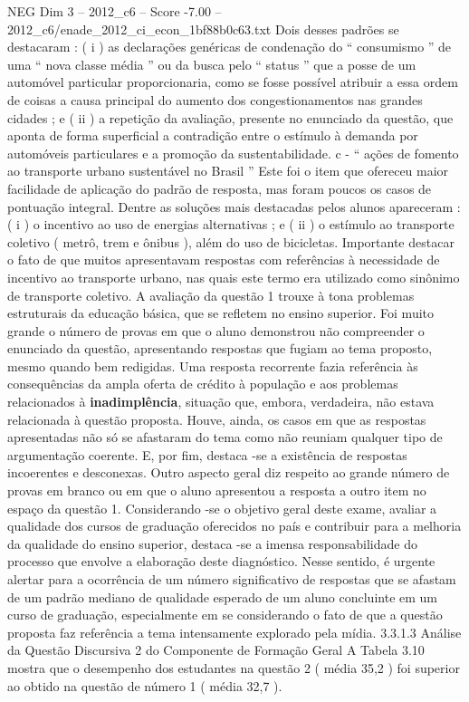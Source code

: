 \begin{textsample}{NEG Dim 3 – 2012\_c6 – Score -7.00 – 2012\_c6/enade\_2012\_ci\_econ\_1bf88b0c63.txt}
Dois desses padrões se destacaram : ( i ) as declarações genéricas de condenação do “ consumismo ” de uma “ nova classe média ” ou da busca pelo “ status ” que a posse de um automóvel particular proporcionaria, como se fosse possível atribuir a essa ordem de coisas a causa principal do aumento dos congestionamentos nas grandes cidades ; e ( ii ) a repetição da avaliação, presente no enunciado da questão, que aponta de forma superficial a contradição entre o estímulo à demanda por automóveis particulares e a promoção da sustentabilidade. c - “ ações de fomento ao transporte urbano sustentável no Brasil ” Este foi o item que ofereceu maior facilidade de aplicação do padrão de resposta, mas foram poucos os casos de pontuação integral.
Dentre as soluções mais destacadas pelos alunos apareceram : ( i ) o incentivo ao uso de energias alternativas ; e ( ii ) o estímulo ao transporte coletivo ( metrô, trem e ônibus ), além do uso de bicicletas.
Importante destacar o fato de que muitos apresentavam respostas com referências à necessidade de incentivo ao transporte urbano, nas quais este termo era utilizado como sinônimo de transporte coletivo.
A avaliação da questão 1 trouxe à tona problemas estruturais da educação básica, que se refletem no ensino superior.
Foi muito grande o número de provas em que o aluno demonstrou não compreender o enunciado da questão, apresentando respostas que fugiam ao tema proposto, mesmo quando bem redigidas.
Uma resposta recorrente fazia referência às consequências da ampla oferta de crédito à população e aos problemas relacionados à \textbf{inadimplência}, situação que, embora, verdadeira, não estava relacionada à questão proposta.
Houve, ainda, os casos em que as respostas apresentadas não só se afastaram do tema como não reuniam qualquer tipo de argumentação coerente.
E, por fim, destaca -se a existência de respostas incoerentes e desconexas.
Outro aspecto geral diz respeito ao grande número de provas em branco ou em que o aluno apresentou a resposta a outro item no espaço da questão 1.
Considerando -se o objetivo geral deste exame, avaliar a qualidade dos cursos de graduação oferecidos no país e contribuir para a melhoria da qualidade do ensino superior, destaca -se a imensa responsabilidade do processo que envolve a elaboração deste diagnóstico.
Nesse sentido, é urgente alertar para a ocorrência de um número significativo de respostas que se afastam de um padrão mediano de qualidade esperado de um aluno concluinte em um curso de graduação, especialmente em se considerando o fato de que a questão proposta faz referência a tema intensamente explorado pela mídia. 3.3.1.3 Análise da Questão Discursiva 2 do Componente de Formação Geral A Tabela 3.10 mostra que o desempenho dos estudantes na questão 2 ( média 35,2 ) foi superior ao obtido na questão de número 1 ( média 32,7 ).

\end{textsample}
